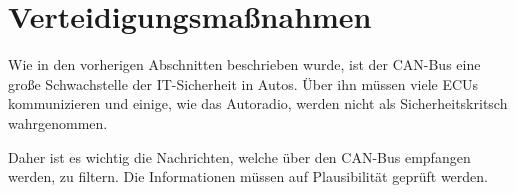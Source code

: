 \section{Verteidigungsmaßnahmen}\label{sec:defense}
Wie in den vorherigen Abschnitten beschrieben wurde, ist der CAN-Bus eine große
Schwachstelle der IT-Sicherheit in Autos. Über ihn müssen viele ECUs
kommunizieren und einige, wie das Autoradio, werden nicht als
Sicherheitskritsch wahrgenommen.

Daher ist es wichtig die Nachrichten, welche über den CAN-Bus empfangen werden,
zu filtern. Die Informationen müssen auf Plausibilität geprüft werden.